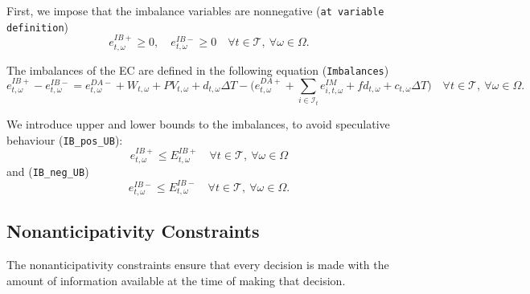 First, we impose that the imbalance variables are nonnegative (\verb|at variable definition|)
\begin{equation} \label{EQ:IBVarDef}
    e_{t, \omega}^{IB+} \geq 0, \quad e_{t, \omega}^{IB-} \geq 0 \quad \forall t \in \mathcal{T}, \ \forall \omega \in \Omega.
\end{equation}

The imbalances of the EC are defined in the following equation (\verb|Imbalances|)
\begin{equation} \label{EQ:IBDef}
    e^{IB+}_{t, \omega} - e^{IB-}_{t, \omega} = e^{DA-}_{t, \omega} + W_{t, \omega} + PV_{t, \omega} + d_{t, \omega} \Delta T - \Big (e^{DA+}_{t, \omega} + \sum_{i \in \mathcal{I}_t} e^{IM}_{i, t, \omega} + fd_{t, \omega} + c_{t, \omega} \Delta T \Big ) \quad \forall t \in \mathcal{T}, \ \forall \omega \in \Omega.
\end{equation}

We introduce upper and lower bounds to the imbalances, to avoid speculative behaviour (\verb|IB_pos_UB|):
\begin{equation} \label{EQ:VPP_IB_MAX}
	e_{t, \omega}^{IB+} \leq E_{t, \omega}^{IB+} \quad \forall t \in \mathcal{T}, \ \forall \omega \in \Omega
\end{equation}
and (\verb|IB_neg_UB|)
\begin{equation} \label{EQ:VPP_IB_MIN}
	e_{t, \omega}^{IB-} \leq E_{t, \omega}^{IB-} \quad \forall t \in \mathcal{T}, \ \forall \omega \in \Omega.
\end{equation}



\subsection{Nonanticipativity Constraints}
\label{SEC:NonanticipativityConstraints}

The nonanticipativity constraints ensure that every decision is made with the amount of information available at the time of making that decision.

